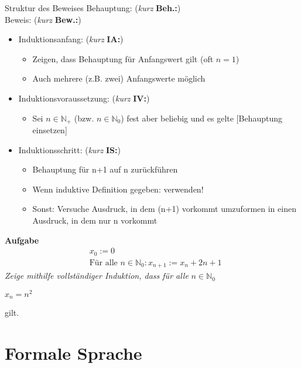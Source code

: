 \begin{frame}{Struktur des Beweises}
	Behauptung: (\textit {kurz} \textbf{Beh.:})\\
	Beweis: (\textit{kurz} \textbf{Bew.:})
	\begin{itemize}
		\pause
		\item Induktionsanfang: (\textit{kurz} \textbf{IA:})
		\begin{itemize}
			\item Zeigen, dass Behauptung für Anfangswert gilt (oft $n=1$)
			\item Auch mehrere (z.B. zwei) Anfangswerte möglich
		\end{itemize}
		\pause
		\item Induktionsvoraussetzung: (\textit{kurz} \textbf{IV:})
		\begin{itemize}
			\item Sei $n \in \mathbb{N}_+$ (bzw. $n \in \mathbb{N}_0$) fest aber beliebig und es gelte [Behauptung einsetzen]
		\end{itemize}
		\pause
		\item Induktionsschritt: (\textit{kurz} \textbf{IS:})
		\begin{itemize}
			\item Behauptung für n+1 auf n zurückführen
			\item Wenn induktive Definition gegeben: verwenden!
			\item Sonst: Versuche Ausdruck, in dem (n+1) vorkommt umzuformen in einen Ausdruck, in dem nur n vorkommt
		\end{itemize}
	\end{itemize}
\end{frame}
\begin{frame}
	\textbf{Aufgabe}\\
	\begin{eqnarray*}
		&x_0 := 0\\
		&\text{Für alle } n \in \mathbb{N}_0: x_{n+1} := x_n + 2n +1
	\end{eqnarray*}			
	\textit{Zeige mithilfe vollständiger Induktion, dass für alle} $n \in \mathbb{N}_0$ \\
	\begin{center}$x_n = n^2$\end{center}
	gilt.
\end{frame}

\section{Formale Sprache}

